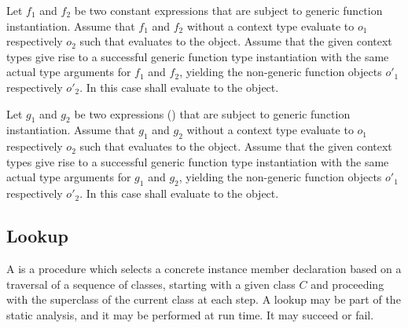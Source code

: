 \documentclass[makeidx]{article}
\begin{document}
{\LMHash{}%
Let $f_1$ and $f_2$ be two constant expressions that are subject to
generic function instantiation.
Assume that $f_1$ and $f_2$ without a context type evaluate to $o_1$
respectively $o_2$ such that 
evaluates to the \TRUE{} object.
Assume that the given context types give rise to a successful
generic function type instantiation with
the same actual type arguments for $f_1$ and $f_2$,
yielding the non-generic function objects $o'_1$ respectively $o'_2$.
In this case 
shall evaluate to the \TRUE{} object.


\LMHash{}%
Let $g_1$ and $g_2$ be two expressions
()
that are subject to generic function instantiation.
Assume that $g_1$ and $g_2$ without a context type evaluate to $o_1$
respectively $o_2$ such that 
evaluates to the \TRUE{} object.
Assume that the given context types give rise to a successful
generic function type instantiation with
the same actual type arguments for $g_1$ and $g_2$,
yielding the non-generic function objects $o'_1$ respectively $o'_2$.
In this case 
shall evaluate to the \TRUE{} object.




\subsection{Lookup}

\LMHash{}%
A  is a procedure which selects
a concrete instance member declaration based on a traversal of
a sequence of classes, starting with a given class $C$
and proceeding with the superclass of the current class at each step.
A lookup may be part of the static analysis, and it may be performed
at run time. It may succeed or fail.

}
\end{document}
